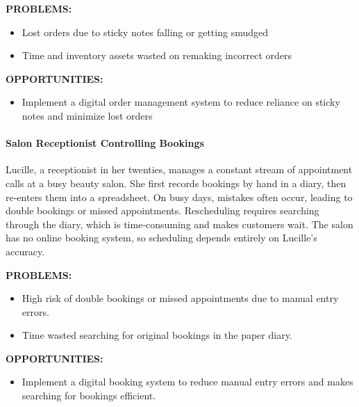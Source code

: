 \documentclass[]{VUMIFTemplateClass}
\newcommand{\yellowcomment}[1]{%
    \begin{tcolorbox}[colback=yellow!80, colframe=yellow!80, arc=0pt, outer arc=0pt, boxrule=0pt, left=3pt, right=3pt, top=3pt, bottom=3pt]
        \textbf{\textcolor{red}{COMMENT:}} #1
    \end{tcolorbox}
}
\newcommand{\todocomment}[1]{%
    \begin{tcolorbox}[colback=red!20, colframe=red!60, arc=0pt, outer arc=0pt, boxrule=1pt, left=3pt, right=3pt, top=3pt, bottom=3pt]
        \textbf{\textcolor{orange!70!black}{TODO:}} #1
    \end{tcolorbox}
}
\newcommand{\subsubsubsection}[1]{\paragraph{#1}}
\begin{document}

\textbf{PROBLEMS:}

\begin{itemize}
    \item Lost orders due to sticky notes falling or getting smudged
    \item Time and inventory assets wasted on remaking incorrect orders
\end{itemize}

\textbf{OPPORTUNITIES:}

\begin{itemize}
    \item Implement a digital order management system to reduce reliance on sticky notes and minimize lost orders
\end{itemize}



\subsubsubsection{Salon Receptionist Controlling Bookings}

Lucille, a receptionist in her twenties, manages a constant stream of appointment calls at a busy beauty salon. She first records bookings by hand in a diary, then re‑enters them into a spreadsheet. On busy days, mistakes often occur, leading to double bookings or missed appointments. Rescheduling requires searching through the diary, which is time‑consuming and makes customers wait. The salon has no online booking system, so scheduling depends entirely on Lucille’s accuracy.

\textbf{PROBLEMS:}

\begin{itemize}
    \item High risk of double bookings or missed appointments due to manual entry errors.
    \item Time wasted searching for original bookings in the paper diary.
\end{itemize}

\textbf{OPPORTUNITIES:}
\begin{itemize}
    \item Implement a digital booking system to reduce manual entry errors and
    makes searching for bookings efficient.
\end{itemize}
\end{document}
